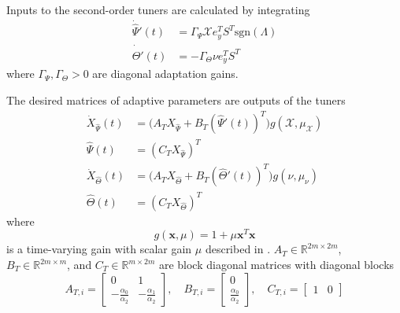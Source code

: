 \documentclass[english]{ifacconf}
\begin{document}
Inputs to the second-order tuners are calculated by integrating
\begin{equation}
\begin{aligned}
\dot{\hat{\Psi}}'(t) &= \Gamma_{\Psi} \mathcal{X} e_y^T S^T \text{sgn}(\Lambda) \\
\dot{\hat{\Theta}}'(t) &= -\Gamma_{\Theta} \nu e_y^T S^T
\end{aligned}
\end{equation}
where $\Gamma_{\Psi}, \Gamma_{\Theta} > 0$ are diagonal adaptation gains. 

The desired matrices of adaptive parameters are outputs of the tuners
\begin{equation}
\begin{aligned}
	\dot{X}_{\hat{\Psi}}(t) &= \big( A_T X_{\hat{\Psi}} + B_T (\hat{\Psi}'(t))^T \big) g(\mathcal{X}, \mu_{\mathcal{X}}) \\
	\hat{\Psi}(t) &= (C_T X_{\hat{\Psi}})^T \\
	\dot{X}_{\hat{\Theta}}(t) &= \big( A_T X_{\hat{\Theta}} + B_T (\hat{\Theta}'(t))^T \big) g(\nu, \mu_{\nu}) \\
	\hat{\Theta}(t) &= (C_T X_{\hat{\Theta}})^T
\end{aligned}	
\end{equation}
where
\begin{equation}
g(\mathbf{x}, \mu) = 1 + \mu \mathbf{x}^T \mathbf{x}	
\end{equation}
is a time-varying gain with scalar gain $\mu$ described in \cite{qu2016phd}. $A_T \in \mathbb{R}^{2m \times 2m}$, $B_T \in \mathbb{R}^{2m \times m}$, and $C_T \in \mathbb{R}^{m \times 2m}$ are block diagonal matrices with diagonal blocks
\begin{equation}
A_{T,i} = \begin{bmatrix}
	0 & 1\\ -\frac{\alpha_0}{\alpha_2} & -\frac{\alpha_1}{\alpha_2}
\end{bmatrix}, \quad B_{T,i} = \begin{bmatrix}
	0 \\ \frac{\alpha_0}{\alpha_2}
\end{bmatrix}, \quad C_{T,i} = \begin{bmatrix}
	1 & 0
\end{bmatrix}
\end{equation}
\end{document}
